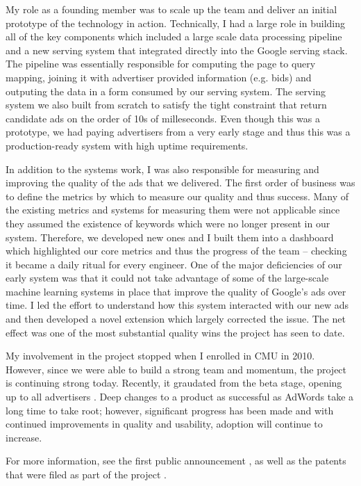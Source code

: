 \documentclass[12pt]{article}
\begin{document}
My role as a founding member was to scale up the team and deliver an initial prototype of the technology in action. Technically, I had a large role in building all of the key components which included a large scale data processing pipeline and a new serving system that integrated directly into the Google serving stack. The pipeline was essentially responsible for computing the page to query mapping, joining it with advertiser provided information (e.g. bids) and outputing the data in a form consumed by our serving system. The serving system we also built from scratch to satisfy the tight constraint that return candidate ads on the order of 10s of milleseconds. Even though this was a prototype, we had paying advertisers from a very early stage and thus this was a production-ready system with high uptime requirements.

In addition to the systems work, I was also responsible for measuring and improving the quality of the ads that we delivered. The first order of business was to define the metrics by which to measure our quality and thus success. Many of the existing metrics and systems for measuring them were not applicable since they assumed the existence of keywords which were no longer present in our system. Therefore, we developed new ones and I built them into a dashboard which highlighted our core metrics and thus the progress of the team -- checking it became a daily ritual for every engineer. One of the major deficiencies of our early system was that it could not take advantage of some of the large-scale machine learning systems in place that improve the quality of Google's ads over time. I led the effort to understand how this system interacted with our new ads and then developed a novel extension which largely corrected the issue. The net effect was one of the most substantial quality wins the project has seen to date.

My involvement in the project stopped when I enrolled in CMU in 2010. However, since we were able to build a strong team and momentum, the project is continuing strong today. Recently, it graudated from the beta stage, opening up to all advertisers \cite{jain}. Deep changes to a product as successful as AdWords take a long time to take root; however, significant progress has been made and with continued improvements in quality and usability, adoption will continue to increase.

For more information, see the first public announcement \cite{gultekin}, as well as the patents that were filed as part of the project \cite{brunsman,brunsman2,brunsman3}.



\end{document}
